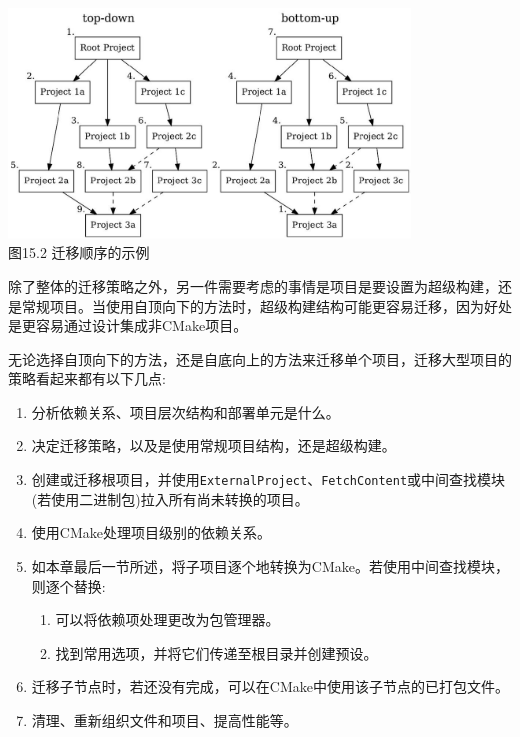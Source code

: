 \begin{center}
\includegraphics[width=0.8\textwidth]{content/3/chapter15/images/2.jpg}\\
图15.2 迁移顺序的示例
\end{center}

除了整体的迁移策略之外，另一件需要考虑的事情是项目是要设置为超级构建，还是常规项目。当使用自顶向下的方法时，超级构建结构可能更容易迁移，因为好处是更容易通过设计集成非CMake项目。

无论选择自顶向下的方法，还是自底向上的方法来迁移单个项目，迁移大型项目的策略看起来都有以下几点:

\begin{enumerate}
\item 
分析依赖关系、项目层次结构和部署单元是什么。

\item 
决定迁移策略，以及是使用常规项目结构，还是超级构建。

\item 
创建或迁移根项目，并使用\texttt{ExternalProject}、\texttt{FetchContent}或中间查找模块(若使用二进制包)拉入所有尚未转换的项目。

\item
使用CMake处理项目级别的依赖关系。

\item
如本章最后一节所述，将子项目逐个地转换为CMake。若使用中间查找模块，则逐个替换:

\begin{enumerate}[label=\roman*]
\item
可以将依赖项处理更改为包管理器。

\item
找到常用选项，并将它们传递至根目录并创建预设。
\end{enumerate}

\item
迁移子节点时，若还没有完成，可以在CMake中使用该子节点的已打包文件。

\item
清理、重新组织文件和项目、提高性能等。
\end{enumerate}


